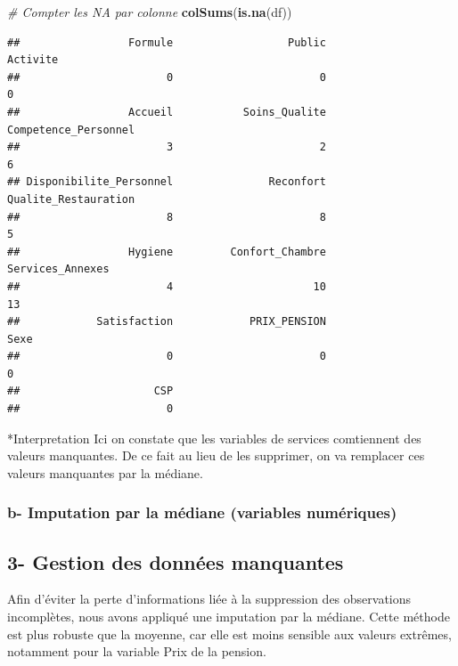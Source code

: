 \documentclass[
]{article}
\newenvironment{Shaded}{\begin{snugshade}}{\end{snugshade}}
\newcommand{\CommentTok}[1]{\textcolor[rgb]{0.56,0.35,0.01}{\textit{#1}}}
\newcommand{\FunctionTok}[1]{\textcolor[rgb]{0.13,0.29,0.53}{\textbf{#1}}}
\newcommand{\NormalTok}[1]{#1}
\begin{document}
\begin{Shaded}
\begin{Highlighting}[]
\CommentTok{\# Compter les NA par colonne}
\FunctionTok{colSums}\NormalTok{(}\FunctionTok{is.na}\NormalTok{(df))}
\end{Highlighting}
\end{Shaded}

\begin{verbatim}
##                 Formule                  Public                Activite 
##                       0                       0                       0 
##                 Accueil           Soins_Qualite    Competence_Personnel 
##                       3                       2                       6 
## Disponibilite_Personnel               Reconfort    Qualite_Restauration 
##                       8                       8                       5 
##                 Hygiene         Confort_Chambre        Services_Annexes 
##                       4                      10                      13 
##            Satisfaction            PRIX_PENSION                    Sexe 
##                       0                       0                       0 
##                     CSP 
##                       0
\end{verbatim}

*Interpretation Ici on constate que les variables de services
comtiennent des valeurs manquantes. De ce fait au lieu de les supprimer,
on va remplacer ces valeurs manquantes par la médiane.

\subsubsection{b- Imputation par la médiane (variables
numériques)}\label{b--imputation-par-la-muxe9diane-variables-numuxe9riques}

\subsection{3- Gestion des données
manquantes}\label{gestion-des-donnuxe9es-manquantes}

Afin d'éviter la perte d'informations liée à la suppression des
observations incomplètes, nous avons appliqué une imputation par la
médiane. Cette méthode est plus robuste que la moyenne, car elle est
moins sensible aux valeurs extrêmes, notamment pour la variable Prix de
la pension.
\end{document}
